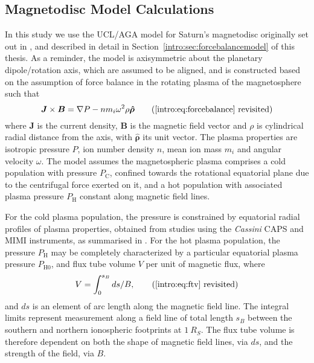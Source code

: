 \subsection{Magnetodisc Model Calculations}\label{compress:sec:model}
In this study we use the UCL/AGA model for Saturn's magnetodisc originally set out in \citet{achilleos2010a}, and described in detail in Section~\ref{intro:sec:forcebalancemodel} of this thesis. As a reminder, the model is axisymmetric about the planetary dipole/rotation axis, which are assumed to be aligned, and is constructed based on the assumption of force balance in the rotating plasma of the magnetosphere such that 
\begin{equation*}\label{compress:eq:forcebalance}
\boldsymbol{J} \times \boldsymbol{B} = \nabla P - nm_i\omega^2\rho\boldsymbol{\hat{\rho}} \tag{\ref{intro:eq:forcebalance} revisited}
\end{equation*}
where $\boldsymbol{J}$ is the current density, $\boldsymbol{B}$ is the magnetic field vector and $\rho$ is cylindrical radial distance from the axis, with $\boldsymbol{\hat{\rho}}$ its unit vector. The plasma properties are isotropic pressure $P$, ion number density $n$, mean ion mass $m_i$ and angular velocity $\omega$. The model assumes the magnetospheric plasma comprises a cold population with pressure $P_\mathrm{C}$, confined towards the rotational equatorial plane due to the centrifugal force exerted on it, and a hot population with associated plasma pressure $P_\mathrm{H}$ constant along magnetic field lines. 

For the cold plasma population, the pressure is constrained by equatorial radial profiles of plasma properties, obtained from studies using the \textit{Cassini} CAPS and MIMI instruments, as summarised in \citet{achilleos2010a,achilleos2010b}. For  the hot plasma population, the pressure $P_\mathrm{H}$ may be completely characterized by a particular equatorial plasma pressure $P_\mathrm{H0}$, and flux tube volume $V$ per unit of magnetic flux, where
\begin{equation}\label{compress:eq:ftv}
V = \int_{0}^{s_{B}} ds/B, \tag{\ref{intro:eq:ftv} revisited}
\end{equation}
and $ds$ is an element of arc length along the magnetic field line. The integral limits represent measurement along a field line of total length $s_B$ between the southern and northern ionospheric footprints at $\SI{1}{R_S}$. The flux tube volume is therefore dependent on both the shape of magnetic field lines, via $ds$, and the strength of the field, via $B$. 

